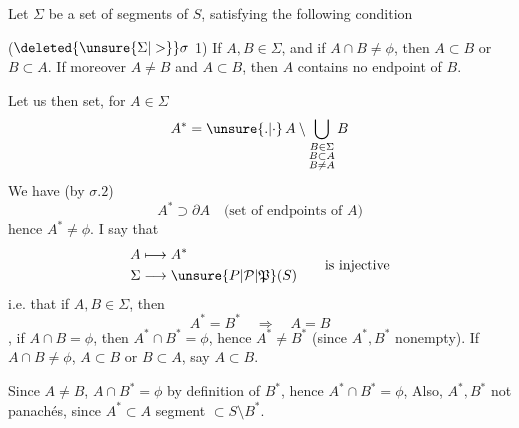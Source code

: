 Let $\Sigma$ be a set of segments of $S$, satisfying the following condition

($\deleted{\unsure{\Sigma|>}}\sigma$ 1) If $A,B\in\Sigma$, and if $A\cap B\ne\phi$, then $A\subset B$ or $B\subset A$.  If moreover $A\ne B$ and $A\subset B$, then $A$ contains no endpoint of $B$.

Let us then set, for $A\in\Sigma$
\[
 A^*=\unsure{.|\cdot}\, A\setminus\bigcup_{\substack{B\in\Sigma\\ B\subset A\\ B\ne A}} B
\]
We have (by $\sigma.2$)
\[
 A^*\supset\partial A\quad\text{(set of endpoints of $A$)}
\]
hence $A^*\ne\phi$. I say that
\[
 \begin{aligned}
 A&\longmapsto A^*\\
 \Sigma&\longrightarrow \unsure{P|\mathcal P|\mathfrak P}(S)
 \end{aligned}
 \qquad\text{is injective}
\]
i.e. that if $A,B\in\Sigma$, then
\[
 A^*=B^*\quad\Longrightarrow\quad A=B
\]
 , if $A\cap B=\phi$, then $A^*\cap B^*=\phi$, hence $A^*\ne B^*$ (since $A^*,B^*$ nonempty). If $A\cap B\ne\phi$,   $A\subset B$ or $B\subset A$, say $A\subset B$.

 Since $A\ne B$, $A\cap B^*=\phi$ by definition of $B^*$, hence $A^*\cap B^*=\phi$,   Also, $A^*,B^*$ not panachés, since $A^*\subset A$ segment $\subset S\setminus B^*$.
